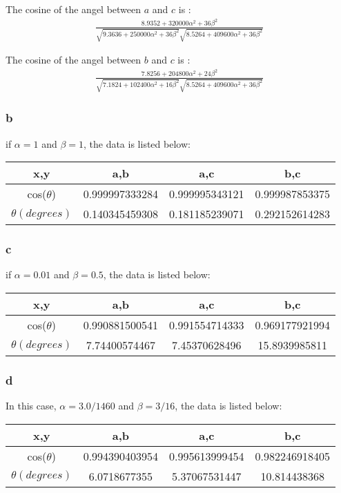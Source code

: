 \documentclass[paper=a4, fontsize=15pt]{article} %
\begin{document}
The cosine of the angel between $a$ and $c$ is :\\
\begin{align}
\frac{8.9352 + 320000\alpha^2 + 36\beta^2}
{\sqrt{9.3636 + 250000\alpha^2 + 36\beta^2} \sqrt{8.5264 + 409600\alpha^2 + 36\beta^2}}
\end{align}

The cosine of the angel between $b$ and $c$ is :\\
\begin{align}
\frac{7.8256 + 204800\alpha^2 + 24\beta^2}
{\sqrt{7.1824 + 102400\alpha^2 + 16\beta^2} \sqrt{8.5264 + 409600\alpha^2 + 36\beta^2}}
\end{align}
\subsubsection*{b}
if $\alpha=1$ and  $\beta=1$, the data is listed below:\\
\begin{tabular}{|c|c|c|c|}
\hline 
x,y & a,b & a,c & b,c \\ 
\hline 
cos($\theta$) & 0.999997333284 & 0.999995343121 & 0.999987853375 \\ 
\hline 
$\theta(degrees)$  & 0.140345459308   &   0.181185239071    & 0.292152614283 \\
\hline
\end{tabular} 

\subsubsection*{c}
if $\alpha=0.01$ and  $\beta=0.5$, the data is listed below:\\
\begin{tabular}{|c|c|c|c|}
\hline 
x,y & a,b & a,c & b,c \\ 
\hline 
cos($\theta$) & 0.990881500541 & 0.991554714333 & 0.969177921994\\ 
\hline 
$\theta(degrees)$  & 7.74400574467  & 7.45370628496  & 15.8939985811\\
\hline
\end{tabular} 

\subsubsection*{d}
In this case, $\alpha=3.0/1460$ and  $\beta=3/16$, the data is listed below:\\
\begin{tabular}{|c|c|c|c|}
\hline 
x,y & a,b & a,c & b,c \\ 
\hline 
cos($\theta$) & 0.994390403954 &  0.995613999454 &  0.982246918405 \\ 
\hline 
$\theta(degrees)$ & 6.0718677355  &  5.37067531447 &  10.814438368\\
\hline
\end{tabular} 
\end{document}
